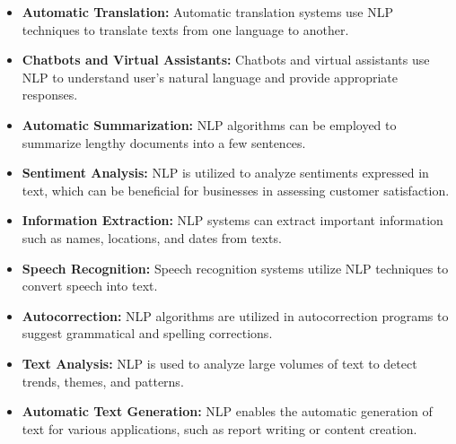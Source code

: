 \begin{itemize}
    \item \textbf{Automatic Translation:} Automatic translation systems use NLP techniques to translate texts from one language to another.
    \item \textbf{Chatbots and Virtual Assistants:} Chatbots and virtual assistants use NLP to understand user's natural language and provide appropriate responses.
    \item \textbf{Automatic Summarization:} NLP algorithms can be employed to summarize lengthy documents into a few sentences.
    \item \textbf{Sentiment Analysis:} NLP is utilized to analyze sentiments expressed in text, which can be beneficial for businesses in assessing customer satisfaction.
    \item \textbf{Information Extraction:} NLP systems can extract important information such as names, locations, and dates from texts.
    \item \textbf{Speech Recognition:} Speech recognition systems utilize NLP techniques to convert speech into text.
    \item \textbf{Autocorrection:} NLP algorithms are utilized in autocorrection programs to suggest grammatical and spelling corrections.
    \item \textbf{Text Analysis:} NLP is used to analyze large volumes of text to detect trends, themes, and patterns.
    \item \textbf{Automatic Text Generation:} NLP enables the automatic generation of text for various applications, such as report writing or content creation.
\end{itemize}
